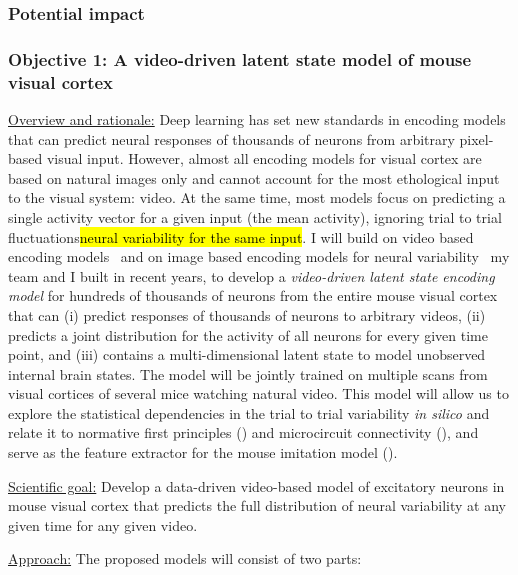 \documentclass[COG,11pt]{ercgrant}
\begin{document}
\subsubsection{Potential impact}

\subsubsection{\colorbox{obji}{\color{white}Objective 1}: A video-driven latent state model of mouse visual cortex}
\label{sub:obji}

\underline{Overview and rationale:}
Deep learning has set new standards in encoding models that can predict neural responses of thousands of neurons from arbitrary pixel-based visual input. However, almost all encoding models for visual cortex are based on natural images only and cannot account for the most ethological input to the visual system: video. At the same time, most models focus on predicting a single activity vector for a given input (the mean activity), ignoring trial to trial fluctuations\hl{neural variability for the same input}. I will build on video based encoding models~\parencite{Sinz2018-sk} and on image based encoding models for neural variability~\parencite{Bashiri2021-or} my team and I built in recent years, to develop a \emph{video-driven latent state encoding model} for hundreds of thousands of neurons from the entire mouse visual cortex that can (i) predict responses of thousands of neurons to arbitrary videos, (ii) predicts a joint distribution for the activity of all neurons for every given time point, and (iii) contains a multi-dimensional latent state to model unobserved internal brain states. The model will be jointly trained on multiple scans from visual cortices of several mice watching natural video. This model will allow us to explore the statistical dependencies in the trial to trial variability \textit{in silico} and relate it to normative first principles (\objii) and microcircuit connectivity (\objiii), and serve as the feature extractor for the mouse imitation model (\objiv). 

\underline{Scientific goal:} Develop a data-driven video-based model of excitatory neurons in mouse visual cortex that predicts the full distribution of neural variability at any given time for any given video.


\underline{Approach:} The proposed models will consist of two parts:
\end{document}
